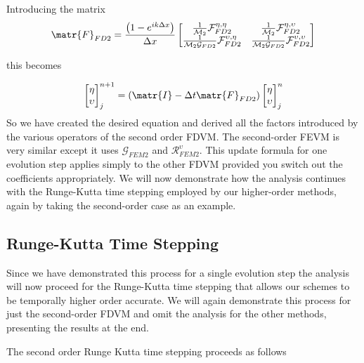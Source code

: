 Introducing the matrix
\begin{equation}
\label{eqn:FluxFactorMatrix}
\matr{F}_{FD2} = \frac{\left(1 - e^{ik\Delta x}\right)}{\Delta x}\begin{bmatrix}
\frac{1}{\mathcal{M}_2}\mathcal{F}_{FD2}^{\eta,\eta} & \frac{1}{\mathcal{M}_2}\mathcal{F}_{FD2}^{\eta,\upsilon} \\ \frac{1}{\mathcal{M}_2\mathcal{G}_{FD2}}\mathcal{F}_{FD2}^{\upsilon,\eta} &  \frac{1}{\mathcal{M}_2\mathcal{G}_{FD2}}\mathcal{F}_{FD2}^{\upsilon,\upsilon} 
\end{bmatrix}
\end{equation}

this becomes

\begin{equation*}
\label{eqn:matrixevolupdate}
\begin{bmatrix}
\eta \\ \upsilon
\end{bmatrix}^{n+1}_j = \left(\matr{I}  - \Delta t \matr{F}_{FD2} \right) \begin{bmatrix}
\eta \\ \upsilon
\end{bmatrix}^{n}_j
\end{equation*}
So we have created the desired equation and derived all the factors introduced by the various operators of the second order FDVM. The second-order FEVM is very similar except it uses $\mathcal{G}_{FEM2}$ and $\mathcal{R}^\upsilon_{FEM2}$. This update formula for one evolution step applies simply to the other FDVM provided you switch out the coefficients appropriately. We will now demonstrate how the analysis continues with the Runge-Kutta time stepping employed by our higher-order methods, again by taking the second-order case as an example.

\subsection{Runge-Kutta Time Stepping}
\label{subsec:RKstepdisp}
Since we have demonstrated this process for a single evolution step the analysis will now proceed for the Runge-Kutta time stepping that allows our schemes to be temporally higher order accurate. We will again demonstrate this process for just the second-order FDVM and omit the analysis for the other methods, presenting the results at the end.

The second order Runge Kutta time stepping proceeds as follows

